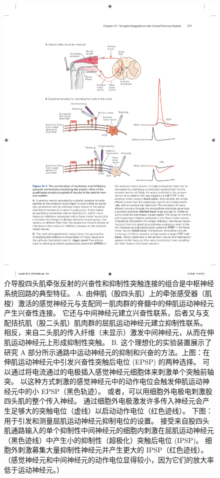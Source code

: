 \begin{figure}[htbp]
	\centering
	\includegraphics[width=0.8\linewidth]{chap13/fig_13_1}
	\caption{介导股四头肌牵张反射的兴奋性和抑制性突触连接的组合是中枢神经系统回路的典型特征。 A. 由伸肌（股四头肌）上的牵张感受器（肌梭）激活的感觉神经元与支配同一肌肉群的脊髓中的伸肌运动神经元产生兴奋性连接。 它还与中间神经元建立兴奋性联系，后者又与支配拮抗肌（股二头肌）肌肉群的屈肌运动神经元建立抑制性联系。 相反，来自二头肌的传入纤维（未显示）激发中间神经元，从而在伸肌运动神经元上形成抑制性突触。 B. 这个理想化的实验装置展示了研究 A 部分所示通路中运动神经元的抑制和兴奋的方法。上图：在伸肌运动神经元中引发兴奋性突触后电位 (EPSP) 的两种选择。 可以通过将电流通过的电极插入感觉神经元细胞体来刺激单个突触前轴突。 以这种方式刺激的感觉神经元中的动作电位会触发伸肌运动神经元中的小 EPSP（黑色轨迹）。 或者，可以用细胞外电极电刺激股四头肌的整个传入神经。 通过细胞外电极激发许多传入神经元会产生足够大的突触电位（虚线）以启动动作电位（红色迹线）。 下图：用于引发和测量屈肌运动神经元抑制电位的设置。 接受来自股四头肌通路输入的单个抑制性中间神经元的细胞内刺激在屈肌运动神经元（黑色迹线）中产生小的抑制性（超极化）突触后电位 (IPSP)。 细胞外刺激募集大量抑制性神经元并产生更大的 IPSP（红色迹线）。 （感觉神经元和中间神经元的动作电位显得较小，因为它们的放大率低于运动神经元。）}
	\label{fig:13_1}
\end{figure}


